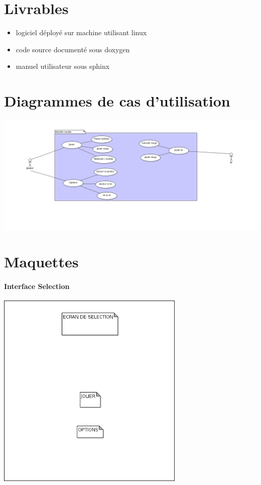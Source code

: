 \documentclass[a4paper,oneside]{article}
\begin{document}

\newpage

\appendix

\section{Livrables}

\begin{itemize}
    \item logiciel déployé sur machine utilisant linux
    \item code source documenté sous doxygen
    \item manuel utilisateur sous sphinx
\end{itemize}

\section{Diagrammes de cas d'utilisation}

\includegraphics[width=19cm]{diagramme.png}




\section{Maquettes}

\paragraph{Interface Selection\\}

\includegraphics[width=9cm]{maquette_selection.png}
\end{document}
